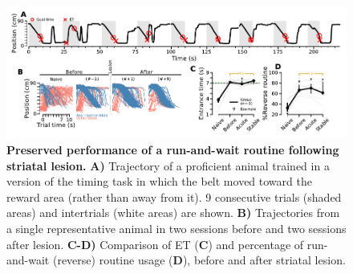 \begin{figure}[bth!]
	\begin{center}
		\includegraphics[width=\textwidth]{ch-lesion/figures/ReverseTreadmill.pdf}
		\caption[Preserved Motor Routine Performance After Lesion]
		{\textbf{Preserved performance of a run-and-wait routine following striatal lesion.}
		\textbf{A)} Trajectory of a proficient animal trained in a version of the timing task in which the belt moved toward the reward area (rather than away from it).
		9 consecutive trials (shaded areas) and intertrials (white areas) are shown.
		\textbf{B)} Trajectories from a single representative animal in two sessions before and two sessions after lesion.
		\textbf{C-D)} Comparison of ET (\textbf{C}) and percentage of run-and-wait (reverse) routine usage (\textbf{D}), before and after striatal lesion.
		}
		\label{fig:lesion:rev}
	\end{center}
\end{figure}
